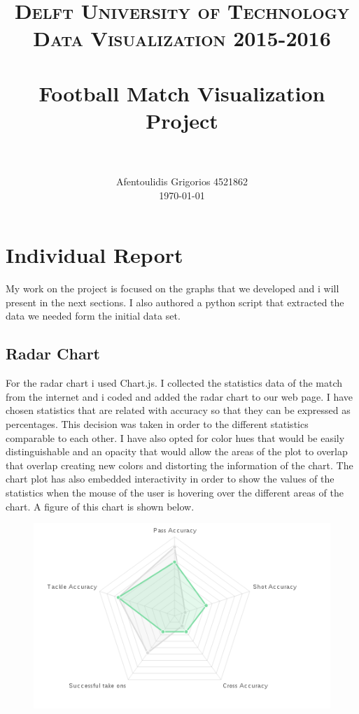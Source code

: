 \documentclass{article}
\title{ 	
		\usefont{OT1}{bch}{b}{n}
		\normalfont \normalsize \textsc{Delft University of Technology \protect\\ Data Visualization 2015-2016} \\ [25pt]
		\horrule{0.5pt} \\[0.4cm]
		\huge Football Match Visualization Project \\
		\horrule{2pt} \\[0.5cm]
}
\author{
		\normalfont 								\normalsize
        Afentoulidis Grigorios 4521862\\[-3pt]		\normalsize
        \today
}
\date{}
\begin{document}
\lstset{language=Prolog}
\maketitle

\section{Individual Report}
My work on the project is focused on the graphs that we developed and i will present in the next sections. I also authored a python script that extracted the data we needed form the initial data set.


\subsection{Radar Chart}
For the radar chart i used Chart.js. I collected the statistics data of the match from the internet and i coded and added the radar chart to our web page. I have chosen statistics that are related with accuracy so that they can be expressed as percentages. This decision was taken in order to the different statistics comparable to each other. I have also opted for color hues that would be easily distinguishable and an opacity that would allow the areas of the plot to overlap that overlap creating new colors and distorting the information of the chart. The chart plot has also embedded interactivity in order to show the values of the statistics when the mouse of the user is hovering over the different areas of the chart. A figure of this chart is shown below.

\begin{figure}[ht!]
\centering
\includegraphics[scale=0.35]{radar}
\end{figure}
\end{document}

